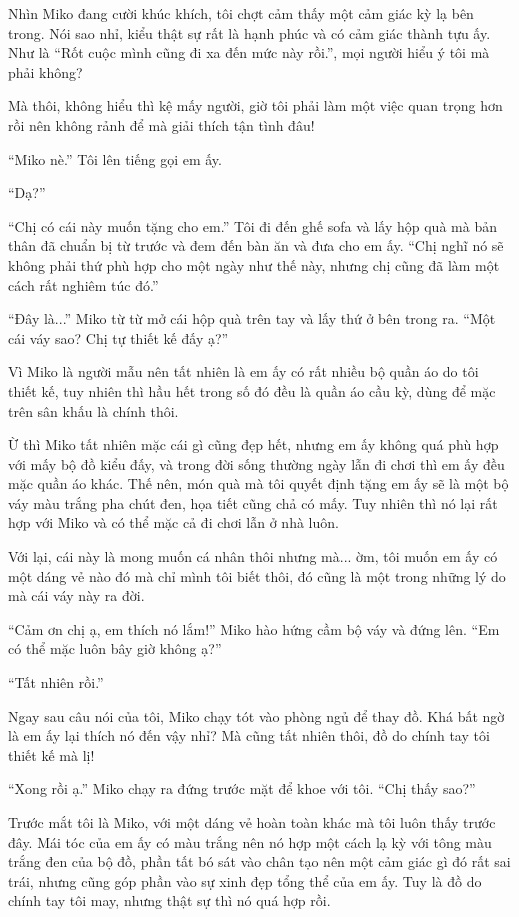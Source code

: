{Nhìn Miko đang cười khúc khích, tôi chợt cảm thấy một cảm giác kỳ lạ bên
trong. Nói sao nhỉ, kiểu thật sự rất là hạnh phúc và có cảm giác thành
tựu ấy. Như là ``Rốt cuộc mình cũng đi xa đến mức này rồi.'', mọi người
hiểu ý tôi mà phải không?

Mà thôi, không hiểu thì kệ mấy người, giờ tôi phải làm một việc quan
trọng hơn rồi nên không rảnh để mà giải thích tận tình đâu!

``Miko nè.'' Tôi lên tiếng gọi em ấy.

``Dạ?''

``Chị có cái này muốn tặng cho em.'' Tôi đi đến ghế sofa và lấy hộp quà
mà bản thân đã chuẩn bị từ trước và đem đến bàn ăn và đưa cho em ấy.
``Chị nghĩ nó sẽ không phải thứ phù hợp cho một ngày như thế này, nhưng
chị cũng đã làm một cách rất nghiêm túc đó.''

``Đây là...'' Miko từ từ mở cái hộp quà trên tay và lấy thứ ở bên trong
ra. ``Một cái váy sao? Chị tự thiết kế đấy ạ?''

Vì Miko là người mẫu nên tất nhiên là em ấy có rất nhiều bộ quần áo do
tôi thiết kế, tuy nhiên thì hầu hết trong số đó đều là quần áo cầu kỳ,
dùng để mặc trên sân khấu là chính thôi.

Ừ thì Miko tất nhiên mặc cái gì cũng đẹp hết, nhưng em ấy không quá phù
hợp với mấy bộ đồ kiểu đấy, và trong đời sống thường ngày lẫn đi chơi
thì em ấy đều mặc quần áo khác. Thế nên, món quà mà tôi quyết định tặng
em ấy sẽ là một bộ váy màu trắng pha chút đen, họa tiết cũng chả có mấy.
Tuy nhiên thì nó lại rất hợp với Miko và có thể mặc cả đi chơi lẫn ở nhà
luôn.

Với lại, cái này là mong muốn cá nhân thôi nhưng mà... ờm, tôi muốn em
ấy có một dáng vẻ nào đó mà chỉ mình tôi biết thôi, đó cũng là một trong
những lý do mà cái váy này ra đời.

``Cảm ơn chị ạ, em thích nó lắm!'' Miko hào hứng cầm bộ váy và đứng lên.
``Em có thể mặc luôn bây giờ không ạ?''

``Tất nhiên rồi.''

Ngay sau câu nói của tôi, Miko chạy tót vào phòng ngủ để thay đồ. Khá
bất ngờ là em ấy lại thích nó đến vậy nhỉ? Mà cũng tất nhiên thôi, đồ do
chính tay tôi thiết kế mà lị!

``Xong rồi ạ.'' Miko chạy ra đứng trước mặt để khoe với tôi. ``Chị thấy
sao?''

Trước mắt tôi là Miko, với một dáng vẻ hoàn toàn khác mà tôi luôn thấy
trước đây. Mái tóc của em ấy có màu trắng nên nó hợp một cách lạ kỳ với
tông màu trắng đen của bộ đồ, phần tất bó sát vào chân tạo nên một cảm
giác gì đó rất sai trái, nhưng cũng góp phần vào sự xinh đẹp tổng thể
của em ấy. Tuy là đồ do chính tay tôi may, nhưng thật sự thì nó quá hợp
rồi.

}
